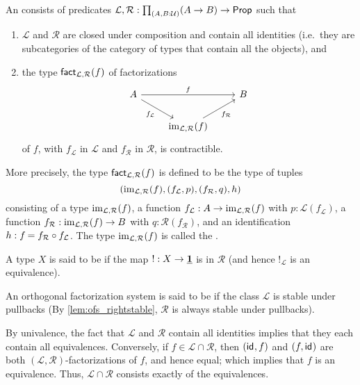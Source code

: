 \begin{defn}\label{defn:sofs}
An  consists of
predicates $\mathcal{L},\mathcal{R}:\prd*{A,B:\UU} (A\to B)\to\prop$ such that
\begin{enumerate}
\item $\mathcal{L}$ and $\mathcal{R}$ are closed under composition and contain all identities (i.e.\ they are subcategories of the category of types that contain all the objects), and
\item the type $\mathsf{fact}_{\mathcal{L},\mathcal{R}}(f)$ of factorizations
\begin{equation*}
\begin{tikzcd}
A \arrow[rr,"f"] \arrow[dr,swap,"f_{\mathcal{L}}"] & & B \\
& \im_{\mathcal{L},\mathcal{R}}(f) \arrow[ur,swap,"f_{\mathcal{R}}"]
\end{tikzcd}
\end{equation*}
of $f$, with $f_{\mathcal{L}}$ in $\mathcal{L}$ and $f_{\mathcal{R}}$ in $\mathcal{R}$, is contractible.
\end{enumerate}
More precisely, the type $\mathsf{fact}_{\mathcal{L},\mathcal{R}}(f)$ is defined to
be the type of
tuples
\begin{equation*}
(\operatorname{im}_{\mathcal{L},\mathcal{R}}(f),(f_{\mathcal{L}},p),(f_{\mathcal{R}},q),h)
\end{equation*}
consisting of a type $\operatorname{im}_{\mathcal{L},\mathcal{R}}(f)$, a function $f_{\mathcal{L}}:A\to \operatorname{im}_{\mathcal{L},\mathcal{R}}(f)$ with
$p:\mathcal{L}(f_{\mathcal{L}})$, a function $f_{\mathcal{R}}:\operatorname{im}_{\mathcal{L},\mathcal{R}}(f)\to B$ with $q:\mathcal{R}(f_{\mathcal{R}})$, and an identification $h:\id{f}{f_{\mathcal{R}}\circ f_{\mathcal{L}}}$. The type $\operatorname{im}_{\mathcal{L},\mathcal{R}}(f)$ is called
the .

A type $X$ is said to be  if
the map $!:X\to\underline{\mathbf{1}}$ is in $\mathcal{R}$ (and hence $!_\mathcal{L}$
is an equivalence).

An orthogonal factorization system is said to be  if the class
$\mathcal{L}$ is stable under pullbacks (By
\autoref{lem:ofs_rightstable}, $\mathcal{R}$ is always stable under pullbacks).
\end{defn}

\begin{rmk}
  By univalence, the fact that $\mathcal{L}$ and $\mathcal{R}$ contain all identities implies that they each contain all equivalences.
  Conversely, if $f\in \mathcal{L}\cap\mathcal{R}$, then $(\mathsf{id}_{},f)$ and $(f,\mathsf{id}_{})$ are both $(\mathcal{L},\mathcal{R})$-factorizations of $f$, and hence equal; which implies that $f$ is an equivalence.
  Thus, $\mathcal{L}\cap\mathcal{R}$ consists exactly of the equivalences.
\end{rmk}

